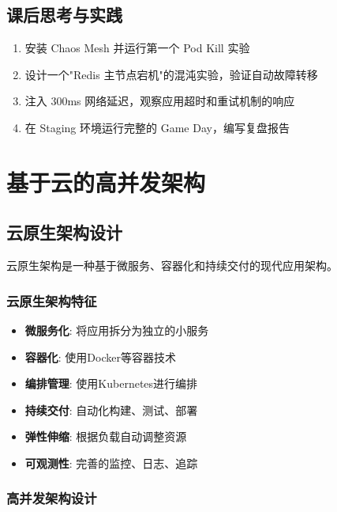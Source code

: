 \documentclass[12pt,UTF8]{ctexbook}
\begin{document}
\section{课后思考与实践}
\label{sec:chaos-practice}
\begin{enumerate}
    \item 安装 Chaos Mesh 并运行第一个 Pod Kill 实验
    \item 设计一个"Redis 主节点宕机"的混沌实验，验证自动故障转移
    \item 注入 300ms 网络延迟，观察应用超时和重试机制的响应
    \item 在 Staging 环境运行完整的 Game Day，编写复盘报告
\end{enumerate}

\chapter{基于云的高并发架构}
\label{chap:cloud-high-concurrency}

\section{云原生架构设计}
\label{sec:cloud-native-arch}

云原生架构是一种基于微服务、容器化和持续交付的现代应用架构。

\subsection{云原生架构特征}

\begin{itemize}
    \item \textbf{微服务化}: 将应用拆分为独立的小服务
    \item \textbf{容器化}: 使用Docker等容器技术
    \item \textbf{编排管理}: 使用Kubernetes进行编排
    \item \textbf{持续交付}: 自动化构建、测试、部署
    \item \textbf{弹性伸缩}: 根据负载自动调整资源
    \item \textbf{可观测性}: 完善的监控、日志、追踪
\end{itemize}

\subsection{高并发架构设计}
\end{document}

